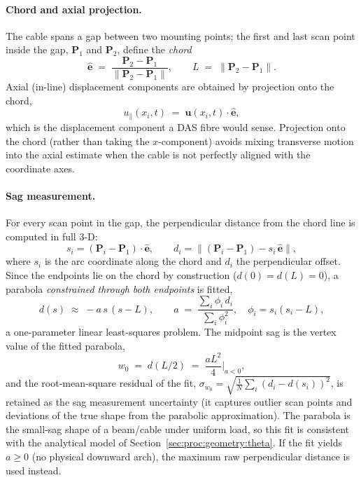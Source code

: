 \paragraph{Chord and axial projection.}
The cable spans a gap between two mounting points; the first and last scan
point inside the gap, $\mathbf{P}_1$ and $\mathbf{P}_2$, define the
\emph{chord}
\begin{equation}
  \hat{\mathbf{e}} \;=\; \frac{\mathbf{P}_2-\mathbf{P}_1}
                              {\lVert\mathbf{P}_2-\mathbf{P}_1\rVert},
  \qquad
  L \;=\; \lVert\mathbf{P}_2-\mathbf{P}_1\rVert .
  \label{eq:chord}
\end{equation}
Axial (in-line) displacement components are obtained by projection onto the
chord,
\begin{equation}
  u_\parallel(x_i, t) \;=\; \mathbf{u}(x_i,t)\cdot\hat{\mathbf{e}},
  \label{eq:projection}
\end{equation}
which is the displacement component a DAS fibre would sense. Projection onto
the chord (rather than taking the $x$-component) avoids mixing transverse
motion into the axial estimate when the cable is not perfectly aligned with
the coordinate axes.

\paragraph{Sag measurement.}
For every scan point in the gap, the perpendicular distance from the chord
line is computed in full 3-D:
\begin{equation}
  s_i = (\mathbf{P}_i - \mathbf{P}_1)\cdot\hat{\mathbf{e}},
  \qquad
  d_i = \bigl\lVert (\mathbf{P}_i-\mathbf{P}_1) - s_i\,\hat{\mathbf{e}}
        \bigr\rVert ,
  \label{eq:perpdist}
\end{equation}
where $s_i$ is the arc coordinate along the chord and $d_i$ the perpendicular
offset. Since the endpoints lie on the chord by construction
($d(0) = d(L) = 0$), a parabola \emph{constrained through both endpoints} is
fitted,
\begin{equation}
  d(s) \;\approx\; -a\, s\,(s - L),
  \qquad
  a \;=\; \frac{\sum_i \phi_i\, d_i}{\sum_i \phi_i^2},
  \quad \phi_i = s_i (s_i - L),
  \label{eq:parabolafit}
\end{equation}
a one-parameter linear least-squares problem. The midpoint sag is the vertex
value of the fitted parabola,
\begin{equation}
  w_0 \;=\; d(L/2) \;=\; \frac{a L^2}{4} \Big|_{a<0} ,
  \label{eq:sagvalue}
\end{equation}
and the root-mean-square residual of the fit,
$\sigma_{w_0} = \sqrt{\tfrac{1}{N}\sum_i (d_i - d(s_i))^2}$, is retained as
the sag measurement uncertainty (it captures outlier scan points and
deviations of the true shape from the parabolic approximation). The parabola
is the small-sag shape of a beam/cable under uniform load, so this fit is
consistent with the analytical model of
Section~\ref{sec:proc:geometry:theta}. If the fit yields $a \ge 0$ (no
physical downward arch), the maximum raw perpendicular distance is used
instead.

